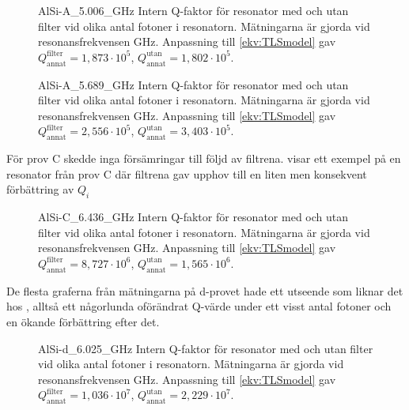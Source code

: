 \documentclass[main.tex]{subfiles}
\begin{document}
\begin{figure}[H]
  \centering
  \setlength{}
  \setlength\figureheight{15em}
  
  \caption{AlSi-A\_5.006\_GHz Intern Q-faktor för resonator med och utan filter vid olika antal fotoner i resonatorn. Mätningarna är gjorda vid resonansfrekvensen \unit[4,953]{GHz}. Anpassning till \ref{ekv:TLSmodel} gav $Q_{\text{annat}}^{\text{filter}}=1,873\cdot10^5$, $Q_{\text{annat}}^{\text{utan}}=1,802\cdot10^5$.}
  \label{fig:A5.006}
\end{figure}

\begin{figure}[H]
  \centering
  \setlength{}
  \setlength\figureheight{15em}
  
  \caption{AlSi-A\_5.689\_GHz Intern Q-faktor för resonator med och utan filter vid olika antal fotoner i resonatorn. Mätningarna är gjorda vid resonansfrekvensen \unit[4,953]{GHz}. Anpassning till \ref{ekv:TLSmodel} gav  $Q_{\text{annat}}^{\text{filter}}=2,556\cdot10^5$, $Q_{\text{annat}}^{\text{utan}}=3,403\cdot10^5$.}
  \label{fig:A5.689}
\end{figure}


För prov C skedde inga försämringar till följd av filtrena.  visar ett exempel på en resonator från prov C där filtrena gav upphov till en liten men konsekvent förbättring av $Q_i$

\begin{figure}[H]
  \centering
  \setlength{}
  \setlength\figureheight{15em}
  
  \caption{AlSi-C\_6.436\_GHz Intern Q-faktor för resonator med och utan filter vid olika antal fotoner i resonatorn. Mätningarna är gjorda vid resonansfrekvensen \unit[4,953]{GHz}. Anpassning till \ref{ekv:TLSmodel} gav $Q_{\text{annat}}^{\text{filter}}=8,727\cdot10^6$, $Q_{\text{annat}}^{\text{utan}}=1,565\cdot10^6$.}
  \label{fig:C6.436}
\end{figure}

De flesta graferna från mätningarna på d-provet hade ett utseende som liknar det hos , alltså ett någorlunda oförändrat Q-värde under ett visst antal fotoner och en ökande förbättring efter det.

\begin{figure}[H]
  \centering
  \setlength{}
  \setlength\figureheight{15em}
  
  \caption{AlSi-d\_6.025\_GHz Intern Q-faktor för resonator med och utan filter vid olika antal fotoner i resonatorn. Mätningarna är gjorda vid resonansfrekvensen \unit[6,025]{GHz}. Anpassning till \ref{ekv:TLSmodel} gav $Q_{\text{annat}}^{\text{filter}}=1,036\cdot10^7$, $Q_{\text{annat}}^{\text{utan}}=2,229\cdot10^7$.}
  \label{fig:d6.025}
\end{figure}
\fi
\end{document}

